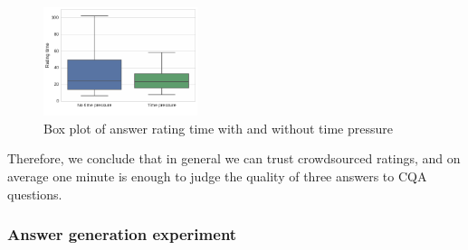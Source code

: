 \begin{figure}
	\centering
	\includegraphics[width=0.4\textwidth]{img/validation_time}
	\caption{Box plot of answer rating time with and without time pressure}
	\label{figure:crowdsourcing:validation_time}
\end{figure}


Therefore, we conclude that in general we can trust crowdsourced ratings, and on average one minute is enough to judge the quality of three answers to CQA questions.

\subsubsection{Answer generation experiment}
\label{section:crowdsourcing:approach:experiments:generation}

